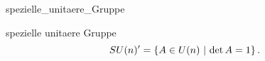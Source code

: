 \documentclass[class=article, crop=false]{standalone}
\begin{document}
\begin{zettel}{spezielle_unitaere_Gruppe}
\begin{flashcard}[us70vnoq]{spezielle unitaere Gruppe}
	\[
		SU (n) '= \set{A \in  U (n)}{\det A = 1}
	.\]
\end{flashcard}
\end{zettel}
\end{document}
